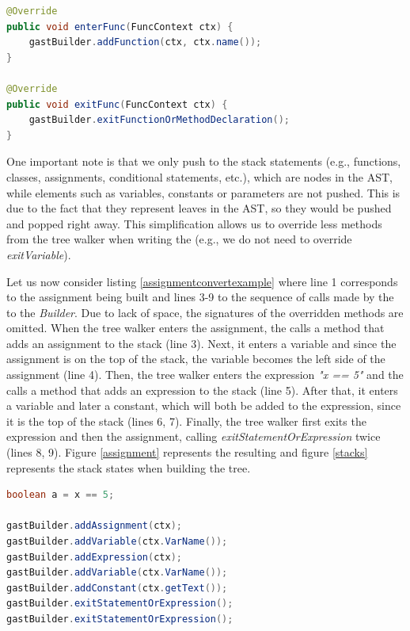 \begin{lstlisting}[language=Java,
    showstringspaces=false,
    caption={Function declaration example},
    label=funccallconvertexample, float]
@Override
public void enterFunc(FuncContext ctx) {
    gastBuilder.addFunction(ctx, ctx.name());
}

@Override
public void exitFunc(FuncContext ctx) {
    gastBuilder.exitFunctionOrMethodDeclaration();
}
\end{lstlisting} 

One important note is that we only push to the stack statements (e.g., functions, classes, assignments, conditional statements, etc.), which are nodes in the AST, while elements such as variables, constants or parameters are not pushed. This is due to the fact that they represent leaves in the AST, so they would be pushed and popped right away. This simplification allows us to override less methods from the tree walker when writing the \converter{} (e.g., we do not need to override \textit{exitVariable}).


Let us now consider listing \ref{assignmentconvertexample} where line 1 corresponds to the assignment being built and lines 3-9 to the sequence of calls made by the \converter{} to the \textit{\astname{} Builder}. Due to lack of space, the signatures of the overridden methods are omitted. When the tree walker enters the assignment, the \converter{} calls a method that adds an assignment to the stack (line 3). Next, it enters a variable and since the assignment is on the top of the stack, the variable becomes the left side of the assignment (line 4). Then, the tree walker enters the expression \textit{"x == 5"} and the \converter{} calls a method that adds an expression to the stack (line 5). After that, it enters a variable and later a constant, which will both be added to the expression, since it is the top of the stack (lines 6, 7). Finally, the tree walker first exits the expression and then the assignment, calling \textit{exitStatementOrExpression} twice (lines 8, 9). Figure \ref{assignment} represents the resulting \astname{} and figure \ref{stacks} represents the stack states when building the tree.

\begin{lstlisting}[language=Java,
    showstringspaces=false,
    caption={Assignment build call sequence},
    label=assignmentconvertexample, float]
boolean a = x == 5;

gastBuilder.addAssignment(ctx);
gastBuilder.addVariable(ctx.VarName());
gastBuilder.addExpression(ctx);
gastBuilder.addVariable(ctx.VarName());
gastBuilder.addConstant(ctx.getText());
gastBuilder.exitStatementOrExpression();
gastBuilder.exitStatementOrExpression();
\end{lstlisting}


